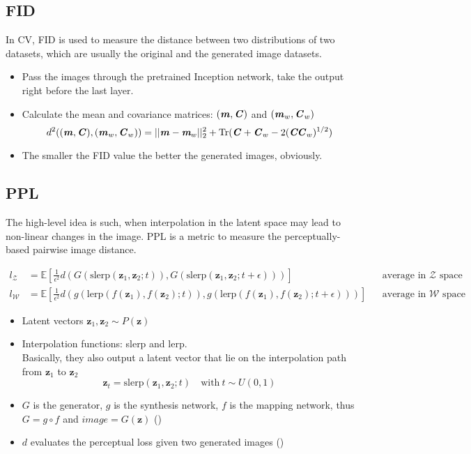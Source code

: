 \subsection{FID}
In \ac{CV}, \ac{FID} is used to measure the distance between two distributions of two datasets, which are usually the original and the generated image datasets. \cite{heusel2017gans}
\begin{itemize}
	\item Pass the images through the pretrained Inception network, take the output right before the last layer.
	\item Calculate the mean and covariance matrices: $(\textbf{\textit{m}}, \textbf{\textit{C}})$ and $(\textbf{\textit{m}}_w, \textbf{\textit{C}}_w)$
	\begin{equation}
		d^2((\textbf{\textit{m}}, \textbf{\textit{C}}), (\textbf{\textit{m}}_w, \textbf{\textit{C}}_w)) = ||\textbf{\textit{m}} - \textit{\textbf{m}}_w||_2^2 + \text{Tr}(\textbf{\textit{C}} + \textbf{\textit{C}}_w - 2(\textbf{\textit{CC}}_w)^{1/2})
	\end{equation}
	\item The smaller the \ac{FID} value the better the generated images, obviously.
\end{itemize}

\subsection{PPL}
The high-level idea is such, when interpolation in the latent space may lead to non-linear changes in the image. 
\ac{PPL} is a metric to measure  the perceptually-based pairwise image distance. \cite{karras2019style}

\begin{align}
	l_{\mathcal{Z}} &= \mathbb{E} \left[ \frac{1}{\epsilon^2} d\left(G(\text{slerp}(\textbf{z}_1, \textbf{z}_2; t)), G(\text{slerp}(\textbf{z}_1, \textbf{z}_2; t + \epsilon))\right) \right] && \text{average in $\mathcal{Z}$ space}\\
	l_{\mathcal{W}} &= \mathbb{E} \left[ \frac{1}{\epsilon^2} d\left(g(\text{lerp}(f(\textbf{z}_1), f(\textbf{z}_2); t)), g(\text{lerp}(f(\textbf{z}_1), f(\textbf{z}_2); t + \epsilon))\right) \right] && \text{average in $\mathcal{W}$ space}
\end{align}

\begin{itemize}
	\item Latent vectors $\textbf{z}_1, \textbf{z}_2 \sim P(\textbf{z})$
	\item Interpolation functions: slerp and lerp.\\
	Basically, they also output a latent vector that lie on the interpolation path from $\textbf{z}_1$ to $\textbf{z}_2$
	\[\textbf{z}_t = \text{slerp}(\textbf{z}_1, \textbf{z}_2; t) \quad \text{with} \ t \sim U(0,1)\]
	\item $G$ is the generator, $g$ is the synthesis network, $f$ is the mapping network, thus $G = g \circ f$ and $image = G(\textbf{z})$ ()
	\item $d$ evaluates the perceptual loss given two generated images ()
\end{itemize}

